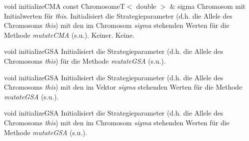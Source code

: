 \documentclass{report}
\begin{document}
\vspace{4ex}

\setNormalInstance
\printMethodWithOneParam
{void}
{initializeCMA}
{const ChromosomeT$<$ double $>$ \&}
{sigma}
{Chromosom mit Initialwerten f\"ur {\em this}.}
{Initialisiert die Strategieparameter (d.h. die Allele des Chromosoms
 {\em this}) mit den im Chromosom {\em sigma} stehenden Werten f\"ur
 die Methode {\em mutateCMA} (s.u.).}
{Keiner.}
{Keine.}

\vspace{4ex}

\setNormalInstance
\setCorrectWidthThree{8pt}
\printMethodWithParamsSaved
{void}
{}
{initializeGSA}
{Initialisiert die Strategieparameter (d.h. die Allele des Chromosoms
 {\em this}) f\"ur die Methode {\em mutateGSA} (s.u.).}
{}
\setCorrectWidthThree{4pt}

\newpage

\setNormalInstance
\setCorrectWidthThree{8pt}
\printMethodWithParamsSaved
{void}
{}
{initializeGSA}
{Initialisiert die Strategieparameter (d.h. die Allele des Chromosoms
 {\em this}) mit den im Vektor {\em sigma} stehenden Werten f\"ur
 die Methode {\em mutateGSA} (s.u.).}
{}
\setCorrectWidthThree{4pt}

\vspace{4ex}

\setNormalInstance
\setCorrectWidthThree{8pt}
\printMethodWithParamsSaved
{void}
{}
{initializeGSA}
{Initialisiert die Strategieparameter (d.h. die Allele des Chromosoms
 {\em this}) mit den im Chromosom {\em sigma} stehenden Werten f\"ur
 die Methode {\em mutateGSA} (s.u.).}
{}
\setCorrectWidthThree{4pt}
\end{document}
